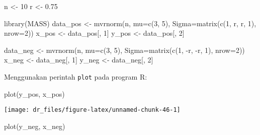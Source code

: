 \documentclass[
]{book}
\newenvironment{Shaded}{\begin{snugshade}}{\end{snugshade}}
\newcommand{\AttributeTok}[1]{\textcolor[rgb]{0.77,0.63,0.00}{#1}}
\newcommand{\DecValTok}[1]{\textcolor[rgb]{0.00,0.00,0.81}{#1}}
\newcommand{\FloatTok}[1]{\textcolor[rgb]{0.00,0.00,0.81}{#1}}
\newcommand{\FunctionTok}[1]{\textcolor[rgb]{0.00,0.00,0.00}{#1}}
\newcommand{\NormalTok}[1]{#1}
\newcommand{\OtherTok}[1]{\textcolor[rgb]{0.56,0.35,0.01}{#1}}
\newcommand{\SpecialCharTok}[1]{\textcolor[rgb]{0.00,0.00,0.00}{#1}}
\begin{document}
\begin{Shaded}
\begin{Highlighting}[]
\NormalTok{n }\OtherTok{\textless{}{-}} \DecValTok{10}
\NormalTok{r }\OtherTok{\textless{}{-}} \FloatTok{0.75}

\FunctionTok{library}\NormalTok{(MASS)}
\NormalTok{data\_pos }\OtherTok{\textless{}{-}} \FunctionTok{mvrnorm}\NormalTok{(n, }\AttributeTok{mu=}\FunctionTok{c}\NormalTok{(}\DecValTok{3}\NormalTok{, }\DecValTok{5}\NormalTok{), }\AttributeTok{Sigma=}\FunctionTok{matrix}\NormalTok{(}\FunctionTok{c}\NormalTok{(}\DecValTok{1}\NormalTok{, r, r, }\DecValTok{1}\NormalTok{), }\AttributeTok{nrow=}\DecValTok{2}\NormalTok{))}
\NormalTok{x\_pos }\OtherTok{\textless{}{-}}\NormalTok{ data\_pos[, }\DecValTok{1}\NormalTok{]}
\NormalTok{y\_pos }\OtherTok{\textless{}{-}}\NormalTok{ data\_pos[, }\DecValTok{2}\NormalTok{]}

\NormalTok{data\_neg }\OtherTok{\textless{}{-}} \FunctionTok{mvrnorm}\NormalTok{(n, }\AttributeTok{mu=}\FunctionTok{c}\NormalTok{(}\DecValTok{3}\NormalTok{, }\DecValTok{5}\NormalTok{), }\AttributeTok{Sigma=}\FunctionTok{matrix}\NormalTok{(}\FunctionTok{c}\NormalTok{(}\DecValTok{1}\NormalTok{, }\SpecialCharTok{{-}}\NormalTok{r, }\SpecialCharTok{{-}}\NormalTok{r, }\DecValTok{1}\NormalTok{), }\AttributeTok{nrow=}\DecValTok{2}\NormalTok{))}
\NormalTok{x\_neg }\OtherTok{\textless{}{-}}\NormalTok{ data\_neg[, }\DecValTok{1}\NormalTok{]}
\NormalTok{y\_neg }\OtherTok{\textless{}{-}}\NormalTok{ data\_neg[, }\DecValTok{2}\NormalTok{]}
\end{Highlighting}
\end{Shaded}

Menggunakan perintah \texttt{plot} pada program R:

\begin{Shaded}
\begin{Highlighting}[]
\FunctionTok{plot}\NormalTok{(y\_pos, x\_pos)}
\end{Highlighting}
\end{Shaded}

\begin{center}\texttt{[image: dr\_files/figure-latex/unnamed-chunk-46-1]} \end{center}

\begin{Shaded}
\begin{Highlighting}[]
\FunctionTok{plot}\NormalTok{(y\_neg, x\_neg)}
\end{Highlighting}
\end{Shaded}
\end{document}
